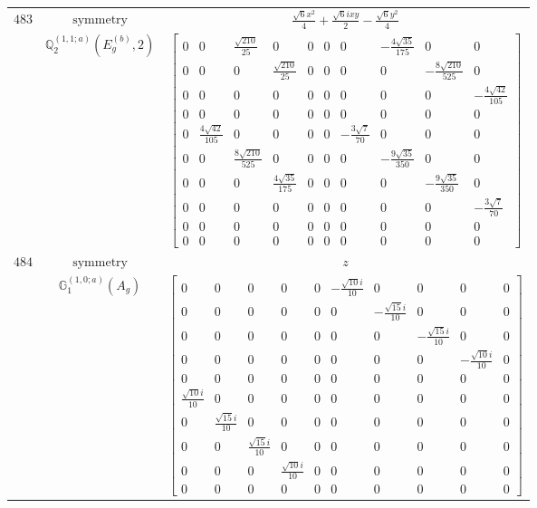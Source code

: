 \documentclass[fleqn,8pt,landscape]{jsarticle}
\begin{document}
\begin{longtable}{ccc}
$ 483 $ & $ \text{symmetry} $ & $ \frac{\sqrt{6} x^{2}}{4} + \frac{\sqrt{6} i x y}{2} - \frac{\sqrt{6} y^{2}}{4} $ \\
$  $ & $ \mathbb{Q}_{2}^{(1,1;a)}(E_{g}^{(b)},2) $ & $ \begin{bmatrix} 0 & 0 & \frac{\sqrt{210}}{25} & 0 & 0 & 0 & 0 & - \frac{4 \sqrt{35}}{175} & 0 & 0 \\ 0 & 0 & 0 & \frac{\sqrt{210}}{25} & 0 & 0 & 0 & 0 & - \frac{8 \sqrt{210}}{525} & 0 \\ 0 & 0 & 0 & 0 & 0 & 0 & 0 & 0 & 0 & - \frac{4 \sqrt{42}}{105} \\ 0 & 0 & 0 & 0 & 0 & 0 & 0 & 0 & 0 & 0 \\ 0 & \frac{4 \sqrt{42}}{105} & 0 & 0 & 0 & 0 & - \frac{3 \sqrt{7}}{70} & 0 & 0 & 0 \\ 0 & 0 & \frac{8 \sqrt{210}}{525} & 0 & 0 & 0 & 0 & - \frac{9 \sqrt{35}}{350} & 0 & 0 \\ 0 & 0 & 0 & \frac{4 \sqrt{35}}{175} & 0 & 0 & 0 & 0 & - \frac{9 \sqrt{35}}{350} & 0 \\ 0 & 0 & 0 & 0 & 0 & 0 & 0 & 0 & 0 & - \frac{3 \sqrt{7}}{70} \\ 0 & 0 & 0 & 0 & 0 & 0 & 0 & 0 & 0 & 0 \\ 0 & 0 & 0 & 0 & 0 & 0 & 0 & 0 & 0 & 0 \end{bmatrix} $ \\ \hline
$ 484 $ & $ \text{symmetry} $ & $ z $ \\
$  $ & $ \mathbb{G}_{1}^{(1,0;a)}(A_{g}) $ & $ \begin{bmatrix} 0 & 0 & 0 & 0 & 0 & - \frac{\sqrt{10} i}{10} & 0 & 0 & 0 & 0 \\ 0 & 0 & 0 & 0 & 0 & 0 & - \frac{\sqrt{15} i}{10} & 0 & 0 & 0 \\ 0 & 0 & 0 & 0 & 0 & 0 & 0 & - \frac{\sqrt{15} i}{10} & 0 & 0 \\ 0 & 0 & 0 & 0 & 0 & 0 & 0 & 0 & - \frac{\sqrt{10} i}{10} & 0 \\ 0 & 0 & 0 & 0 & 0 & 0 & 0 & 0 & 0 & 0 \\ \frac{\sqrt{10} i}{10} & 0 & 0 & 0 & 0 & 0 & 0 & 0 & 0 & 0 \\ 0 & \frac{\sqrt{15} i}{10} & 0 & 0 & 0 & 0 & 0 & 0 & 0 & 0 \\ 0 & 0 & \frac{\sqrt{15} i}{10} & 0 & 0 & 0 & 0 & 0 & 0 & 0 \\ 0 & 0 & 0 & \frac{\sqrt{10} i}{10} & 0 & 0 & 0 & 0 & 0 & 0 \\ 0 & 0 & 0 & 0 & 0 & 0 & 0 & 0 & 0 & 0 \end{bmatrix} $ \\ \hline

\end{longtable}
\end{document}
